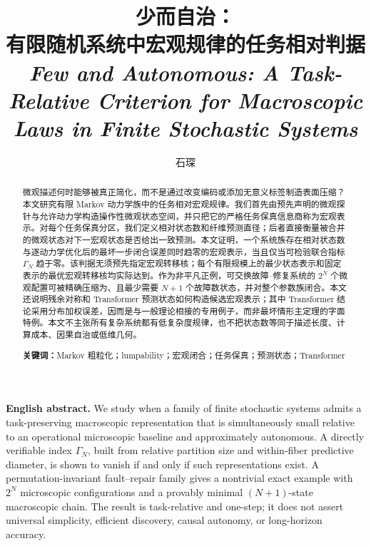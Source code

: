 \documentclass[UTF8,fontset=fandol,11pt,a4paper]{ctexart}
\title{\bfseries 少而自治：\\[0.35em]
\Large 有限随机系统中宏观规律的任务相对判据\\[0.8em]
\normalsize \textit{Few and Autonomous: A Task-Relative Criterion for Macroscopic Laws in Finite Stochastic Systems}}
\author{石琛}
\date{}
\begin{document}
\maketitle

\begin{abstract}
微观描述何时能够被真正简化，而不是通过改变编码或添加无意义标签制造表面压缩？本文研究有限 Markov 动力学族中的任务相对宏观规律。我们首先由预先声明的微观探针与允许动力学构造操作性微观状态空间，并只把它的严格任务保真信息商称为宏观表示。对每个任务保真分区，我们定义相对状态数和纤维预测直径；后者直接衡量被合并的微观状态对下一宏观状态是否给出一致预测。本文证明，一个系统族存在相对状态数与逐动力学优化后的最坏一步闭合误差同时趋零的宏观表示，当且仅当可检验联合指标 $\Gamma_N$ 趋于零。该判据无须预先指定宏观转移核；每个有限规模上的最少状态表示和固定表示的最优宏观转移核均实际达到。作为非平凡正例，可交换故障--修复系统的 $2^N$ 个微观配置可被精确压缩为、且最少需要 $N+1$ 个故障数状态，并对整个参数族闭合。本文还说明残余对称和 Transformer 预测状态如何构造候选宏观表示；其中 Transformer 结论采用分布加权误差，因而是与一般理论相接的专用例子，而非最坏情形主定理的字面特例。本文不主张所有复杂系统都有低复杂度规律，也不把状态数等同于描述长度、计算成本、因果自治或低维几何。

\medskip
\noindent\textbf{关键词：}Markov 粗粒化；lumpability；宏观闭合；任务保真；预测状态；Transformer
\end{abstract}

\begin{center}
\begin{minipage}{0.94\textwidth}
\small
\textbf{English abstract.}
We study when a family of finite stochastic systems admits a task-preserving macroscopic representation that is simultaneously small relative to an operational microscopic baseline and approximately autonomous. A directly verifiable index $\Gamma_N$, built from relative partition size and within-fiber predictive diameter, is shown to vanish if and only if such representations exist. A permutation-invariant fault--repair family gives a nontrivial exact example with $2^N$ microscopic configurations and a provably minimal $(N+1)$-state macroscopic chain. The result is task-relative and one-step; it does not assert universal simplicity, efficient discovery, causal autonomy, or long-horizon accuracy.
\end{minipage}
\end{center}

\clearpage
\tableofcontents
\clearpage









\end{document}

